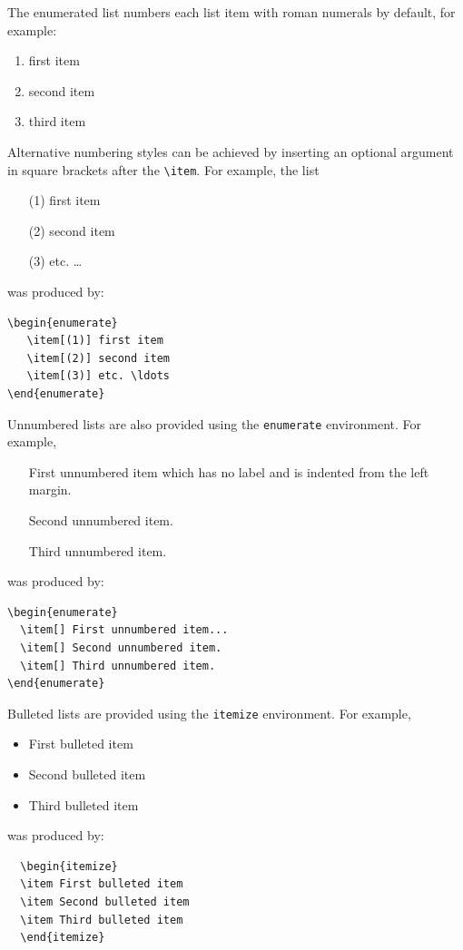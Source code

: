\documentclass[]{tRSL2e}
\begin{document}
The enumerated list numbers each list item with roman numerals by default, for example:
%
\begin{enumerate}
   \item first item
   \item second item
   \item third item
\end{enumerate}
%
Alternative numbering styles can be achieved by inserting an optional argument in square brackets after the
\verb"\item". For example, the list
%
\begin{enumerate}
   \item[(1)] first item
   \item[(2)] second item
   \item[(3)] etc. \ldots
\end{enumerate}
%
was produced by:
%
\begin{verbatim}
\begin{enumerate}
   \item[(1)] first item
   \item[(2)] second item
   \item[(3)] etc. \ldots
\end{enumerate}
\end{verbatim}
%
Unnumbered lists are also provided using the {\tt enumerate} environment. For example,
\begin{enumerate}
   \item[] First unnumbered item which has no label and is indented from
         the left margin.
   \item[] Second unnumbered item.
   \item[] Third unnumbered item.
\end{enumerate}
was produced by:
%
\begin{verbatim}
\begin{enumerate}
  \item[] First unnumbered item...
  \item[] Second unnumbered item.
  \item[] Third unnumbered item.
\end{enumerate}
\end{verbatim}
%
Bulleted lists are provided using the {\tt itemize} environment. For example,
\begin{itemize}
\item First bulleted item
\item Second bulleted item
\item Third bulleted item
\end{itemize}
was produced by:
\begin{verbatim}
  \begin{itemize}
  \item First bulleted item
  \item Second bulleted item
  \item Third bulleted item
  \end{itemize}
\end{verbatim}
\end{document}
